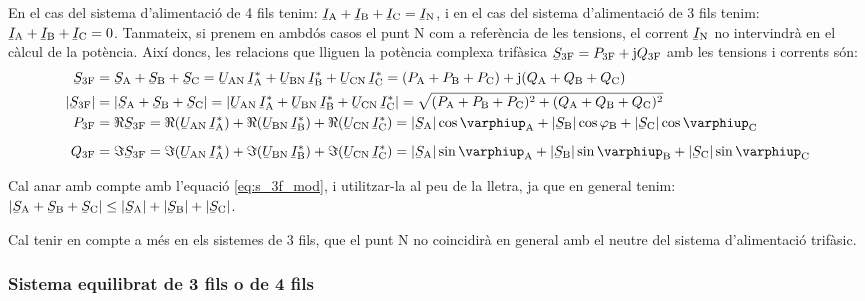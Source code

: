 En el cas del sistema d'alimentació de 4 fils tenim:
$\cmplx{I}\ped{A}+\cmplx{I}\ped{B}+\cmplx{I}\ped{C}=\cmplx{I}\ped{N}$, i
en el cas del sistema d'alimentació de 3 fils tenim:
$\cmplx{I}\ped{A}+\cmplx{I}\ped{B}+\cmplx{I}\ped{C}=0$. Tanmateix,
si prenem en ambdós casos el punt N com a referència de les
tensions, el corrent $\cmplx{I}\ped{N}$ no intervindrà en el càlcul de
la potència. Així doncs, les relacions que lliguen la potència
complexa trifàsica $\cmplx{S}\ped{3F} = P\ped{3F} + \ju Q\ped{3F}$
amb les tensions i corrents són:
\begin{align}
    \cmplx{S}\ped{3F} &= \cmplx{S}\ped{A} + \cmplx{S}\ped{B} + \cmplx{S}\ped{C} =
     \cmplx{U}\ped{AN}\, \cmplx{I}\ped{A}^* +
    \cmplx{U}\ped{BN} \,\cmplx{I}\ped{B}^* +  \cmplx{U}\ped{CN}\, \cmplx{I}\ped{C}^* =
    (P\ped{A} + P\ped{B} + P\ped{C}) + \ju (Q\ped{A} + Q\ped{B} + Q\ped{C}) \label{eq:s_3f} \\
    |\cmplx{S}\ped{3F}| &= |\cmplx{S}\ped{A} + \cmplx{S}\ped{B} + \cmplx{S}\ped{C}| =
    |\cmplx{U}\ped{AN}\, \cmplx{I}\ped{A}^* +
    \cmplx{U}\ped{BN} \,\cmplx{I}\ped{B}^* +  \cmplx{U}\ped{CN}\, \cmplx{I}\ped{C}^*| =
    \sqrt{(P\ped{A} + P\ped{B} + P\ped{C})^2 + (Q\ped{A} + Q\ped{B} + Q\ped{C})^2} \label{eq:s_3f_mod} \\
    P\ped{3F} &= \Re\cmplx{S}\ped{3F} = \Re(\cmplx{U}\ped{AN} \,\cmplx{I}\ped{A}^*) +
    \Re(\cmplx{U}\ped{BN} \,\cmplx{I}\ped{B}^*) +  \Re(\cmplx{U}\ped{CN}\,
    \cmplx{I}\ped{C}^*) = |\cmplx{S}\ped{A}| \cos \varphiup\ped{A} + |\cmplx{S}\ped{B}| \cos
    \varphi\ped{B} + |\cmplx{S}\ped{C}| \cos \varphiup\ped{C} \\[2mm]
    Q\ped{3F} &= \Im\cmplx{S}\ped{3F} = \Im(\cmplx{U}\ped{AN} \,\cmplx{I}\ped{A}^*) +
    \Im(\cmplx{U}\ped{BN} \,\cmplx{I}\ped{B}^*) +  \Im(\cmplx{U}\ped{CN}\,
    \cmplx{I}\ped{C}^*) = |\cmplx{S}\ped{A}| \sin \varphiup\ped{A} + |\cmplx{S}\ped{B}| \sin
    \varphiup\ped{B} + |\cmplx{S}\ped{C}| \sin \varphiup\ped{C}
\end{align}

Cal anar amb compte amb l'equació \eqref{eq:s_3f_mod}, i utilitzar-la al
peu de la lletra, ja
que en general tenim: $|\cmplx{S}\ped{A} + \cmplx{S}\ped{B} + \cmplx{S}\ped{C}| \leq
|\cmplx{S}\ped{A}| + |\cmplx{S}\ped{B}| + |\cmplx{S}\ped{C}|$.

Cal tenir en compte a més en els sistemes de 3 fils, que el punt
N no coincidirà en general amb el neutre del sistema
d'alimentació trifàsic.

\subsubsection{Sistema equilibrat de 3 fils o de 4 fils}

